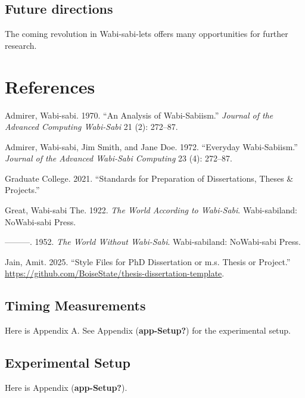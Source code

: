 \documentclass[
  dissertation]{bsu-cs}
\newlength{\cslhangindent}
\newenvironment{CSLReferences}[2] %
 {\begin{list}{}{%
  \setlength{\itemindent}{0pt}
  \setlength{\leftmargin}{0pt}
  \setlength{\parsep}{0pt}
  \ifodd #1
   \setlength{\leftmargin}{\cslhangindent}
   \setlength{\itemindent}{-1\cslhangindent}
  \fi
  \setlength{\itemsep}{#2\baselineskip}}}
 {\end{list}}
\begin{document}
\section{Future directions}\label{future-directions}

The coming revolution in Wabi-sabi-lets offers many opportunities for
further research.

\chapter{References}

\label{refs}
\begin{CSLReferences}{1}{0}
Admirer, Wabi-sabi. 1970. {``An Analysis of Wabi-Sabiism.''}
\emph{Journal of the Advanced Computing Wabi-Sabi} 21 (2): 272--87.

Admirer, Wabi-sabi, Jim Smith, and Jane Doe. 1972. {``Everyday
Wabi-Sabiism.''} \emph{Journal of the Advanced Wabi-Sabi Computing} 23
(4): 272--87.

Graduate College. 2021. {``Standards for Preparation of Dissertations,
Theses \& Projects.''}

Great, Wabi-sabi The. 1922. \emph{The World According to Wabi-Sabi}.
Wabi-sabiland: NoWabi-sabi Press.

---------. 1952. \emph{The World Without Wabi-Sabi}. Wabi-sabiland:
NoWabi-sabi Press.

Jain, Amit. 2025. {``Style Files for PhD Dissertation or m.s. Thesis or
Project.''}
\url{https://github.com/BoiseState/thesis-dissertation-template}.

\end{CSLReferences}

\appendix

\section{Timing Measurements}\label{app-Timing}

Here is Appendix A. See Appendix (\textbf{app-Setup?}) for the
experimental setup.

\section{Experimental Setup}\label{app-Setup}

Here is Appendix (\textbf{app-Setup?}).

\finish

\backmatter


\end{document}
